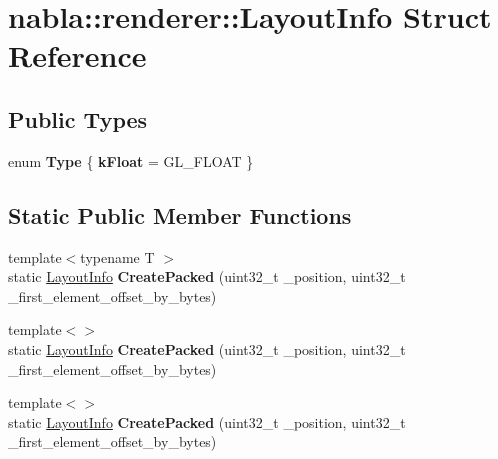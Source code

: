\hypertarget{structnabla_1_1renderer_1_1_layout_info}{}\section{nabla\+::renderer\+::Layout\+Info Struct Reference}
\label{structnabla_1_1renderer_1_1_layout_info}
\subsection*{Public Types}
\begin{DoxyCompactItemize}
\item 
\mbox{\label{structnabla_1_1renderer_1_1_layout_info_a441b62df0e5b0aff890bccd5ca373ac0}} 
enum {\bfseries Type} \{ {\bfseries k\+Float} = G\+L\+\_\+\+F\+L\+O\+AT
 \}
\end{DoxyCompactItemize}
\subsection*{Static Public Member Functions}
\begin{DoxyCompactItemize}
\item 
\mbox{\label{structnabla_1_1renderer_1_1_layout_info_a2f31256be38129328d8a2d3270e48d2d}} 
{\footnotesize template$<$typename T $>$ }\\static \mbox{\hyperlink{structnabla_1_1renderer_1_1_layout_info}{Layout\+Info}} {\bfseries Create\+Packed} (uint32\+\_\+t \+\_\+position, uint32\+\_\+t \+\_\+first\+\_\+element\+\_\+offset\+\_\+by\+\_\+bytes)
\item 
\mbox{\label{structnabla_1_1renderer_1_1_layout_info_abe74dba98af6a9d22ade9307e1be395d}} 
{\footnotesize template$<$$>$ }\\static \mbox{\hyperlink{structnabla_1_1renderer_1_1_layout_info}{Layout\+Info}} {\bfseries Create\+Packed} (uint32\+\_\+t \+\_\+position, uint32\+\_\+t \+\_\+first\+\_\+element\+\_\+offset\+\_\+by\+\_\+bytes)
\item 
\mbox{\label{structnabla_1_1renderer_1_1_layout_info_abe74dba98af6a9d22ade9307e1be395d}} 
{\footnotesize template$<$$>$ }\\static \mbox{\hyperlink{structnabla_1_1renderer_1_1_layout_info}{Layout\+Info}} {\bfseries Create\+Packed} (uint32\+\_\+t \+\_\+position, uint32\+\_\+t \+\_\+first\+\_\+element\+\_\+offset\+\_\+by\+\_\+bytes)
\end{DoxyCompactItemize}

